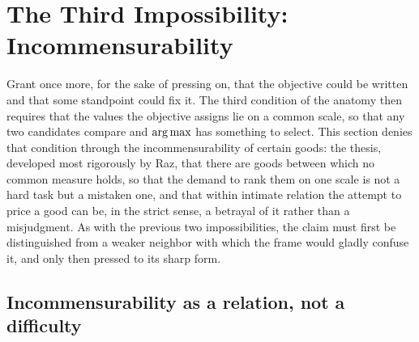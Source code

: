 \section{The Third Impossibility: Incommensurability}
\label{p25:sec:incommensurability}

\noindent
Grant once more, for the sake of pressing on, that the objective could be written and that some standpoint could fix it. The third condition of the anatomy then requires that the values the objective assigns lie on a common scale, so that any two candidates compare and $\operatorname*{arg\,max}$ has something to select. This section denies that condition through the incommensurability of certain goods: the thesis, developed most rigorously by Raz, that there are goods between which no common measure holds, so that the demand to rank them on one scale is not a hard task but a mistaken one, and that within intimate relation the attempt to price a good can be, in the strict sense, a betrayal of it rather than a misjudgment. As with the previous two impossibilities, the claim must first be distinguished from a weaker neighbor with which the frame would gladly confuse it, and only then pressed to its sharp form.

\subsection*{Incommensurability as a relation, not a difficulty}

